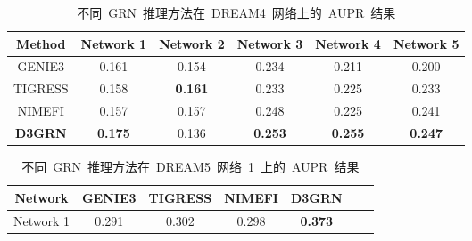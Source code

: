 \begin{table}[!htbp]
  \centering
  \begin{threeparttable}  
  \caption{不同~GRN~推理方法在~DREAM4~网络上的~AUPR~结果}

  \label{tab:performance_dr4} 
    \begin{tabular}{cccccc}  
    \toprule  
    Method
     & Network 1&  Network 2&  Network 3&  Network 4 & Network 5\\
    \midrule  
    GENIE3  &0.161   &0.154           &0.234      &0.211          &0.200                 \\
    TIGRESS &0.158   &\textbf{0.161}           &0.233      &0.225          &0.233                \\
    NIMEFI  &0.157   &0.157           &0.248      &0.225          &0.241                \\
    \textbf{D3GRN}   &\textbf{0.175}  &0.136      &\textbf{0.253} &\textbf{0.255}       &\textbf{0.247}  \\
    \bottomrule  
    \end{tabular}  
   \end{threeparttable}
\end{table} 

\begin{table}[!htbp]
  \centering  
  \begin{threeparttable}  
  \caption{不同~GRN~推理方法在~DREAM5~网络~1~上的~AUPR~结果}

  \label{tab:performance_dr5} 
    \begin{tabular}{ccccccc}  
    \toprule  
    Network&GENIE3 &TIGRESS &NIMEFI  &\textbf{D3GRN}\\
    \midrule  
    Network 1&0.291 &0.302 &0.298 &\textbf{0.373}\\
    \bottomrule  
    \end{tabular}  
    \end{threeparttable}
\end{table} 


